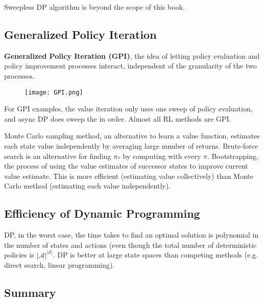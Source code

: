 \documentclass[sutton_barto_notes.tex]{subfiles}
\begin{document}
Sweepless DP algorithm is beyond the scope of this book.

\subsection{Generalized Policy Iteration}

\begin{definition}
\textbf{Generalized Policy Iteration (GPI)}, the idea of letting policy evaluation and policy improvement processes interact, independent of the granularity of the two processes.
\end{definition}
\begin{figure}[!h]
  \centering
  \texttt{[image: GPI.png]}
  \label{fig:GPI}
\end{figure}

For GPI examples, the value iteration only uses one sweep of policy evaluation, and async DP does sweep the in order. Almost all RL methods are GPI.

Monte Carlo sampling method, an alternative to learn a value function, estimates each state value independently by averaging large number of returns.
Brute-force search is an alternative for finding $\pi_*$ by computing with every $\pi$.
Bootstrapping, the process of using the value estimates of successor states to improve current value estimate. This is more efficient (estimating value collectively) than Monte Carlo method (estimating each value independently).

\subsection{Efficiency of Dynamic Programming}

DP, in the worst case, the time takes to find an optimal solution is polynomial in the number of states and actions (even though the total number of deterministic policies is $|\mathcal{A}|^{|\mathcal{S}|}$. DP is better at large state spaces than competing methods (e.g. direct search, linear programming).

\subsection{Summary}
\end{document}
